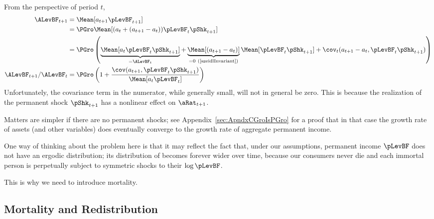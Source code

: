 \documentclass[BufferStockTheory]{subfiles}
\begin{document}
From the perspective of period $t$, %
\begin{align*}
  \ALevBF_{t+1} & = \Mean[a_{t+1} \pLevBF_{t+1}]
  \\              & = \PGro \Mean[(a_{t}+(a_{t+1}-a_{t}))\pLevBF_{t}\pShk_{t+1}]
  \\              & = \PGro \left(\underbrace{\Mean[a_{t}\pLevBF_{t}\pShk_{t+1}]}_{=\ALevBF_{t}}+\underbrace{\Mean[(a_{t+1}-a_{t})]}_{=0~(\text{\cite{szeidlInvariant}})}\Mean[\pLevBF_{t}\pShk_{t+1}]+\cov_{t}(a_{t+1}-a_{t},\pLevBF_{t}\pShk_{t+1})\right)
  \\ \ALevBF_{t+1}/\ALevBF_{t}                    & = \PGro \left(1+\frac{\cov(a_{t+1},\pLevBF_{t}\pShk_{t+1})}{\Mean[a_{t}\pLevBF_{t}]}\right)
\end{align*}
Unfortunately, the covariance term in the numerator, while generally small, will not in general be zero.  This is because the realization of the permanent shock $\pShk_{t+1}$ has a nonlinear effect on $\aRat_{t+1}$.
\begin{comment}
\begin{align}
  \aFunc(\mRat_{t+1}) & \approx \aFunc(\mRat_{t})+\aFunc^{\prime}(\mRat_{t})(m_{t+1}-\mRat_{t})
\\ \cov_{t}(a_{t+1}-a_{t},\pLevBF_{t}\pShk_{t+1}) & \approx \cov_{t}\left( \aFunc^{\prime}(\mRat_{t})(m_{t+1}-\mRat_{t}),\pShk_{t+1} \pLevBF_{t})
\end{align}
\end{comment}
Matters are simpler if there are no permanent shocks; see Appendix~\ref{sec:ApndxCGroIsPGro} for a proof that in that case the growth rate of assets (and other variables) does eventually converge to the growth rate of aggregate permanent income.

One way of thinking about the problem here is that it may reflect the fact that, under our assumptions, permanent income $\pLevBF$ does not have an ergodic distribution; its distribution of becomes forever wider over time, because our consumers never die and each immortal person is perpetually subject to symmetric shocks to their $\log \pLevBF$.

This is why we need to introduce mortality.


\hypertarget{Mortality-And-Redistribution}{}
\subsection{Mortality and Redistribution}\label{sec:Mortality-And-Redistribution}
\end{document}
